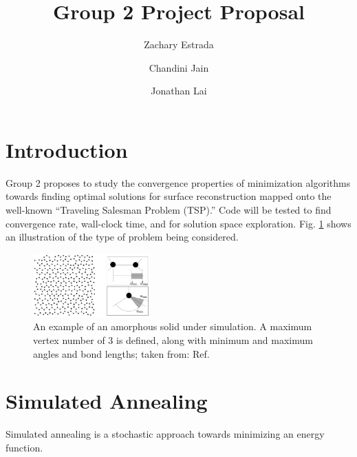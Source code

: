 \documentclass[10pt,twocolumn,notitlepage]{article}
\title{\vspace{-6ex} \textbf{Group 2 Project Proposal}}
\author{Zachary Estrada \and Chandini Jain \and Jonathan Lai}
\begin{document}
\maketitle

\section{Introduction}
Group 2 proposes to study the convergence properties of minimization algorithms towards finding optimal solutions for surface reconstruction mapped onto the well-known ``Traveling Salesman Problem (TSP).''  Code will be tested to find convergence rate, wall-clock time, and for solution space exploration. Fig. \ref{fig:amorphousSilicon} shows an illustration of the type of problem being considered.

\begin{figure}[h!]
	\centering
	\includegraphics[width=0.4\textwidth]{Figures/amorphousSilicon.png}
	\caption{An example of an amorphous solid under simulation.  A maximum vertex number of 3 is defined, along with minimum and maximum angles and bond lengths; taken from: Ref. \protect{}}
	\label{fig:amorphousSilicon}
\end{figure}


\section{Simulated Annealing}
Simulated annealing is a stochastic approach towards minimizing an energy function.
\end{document}
